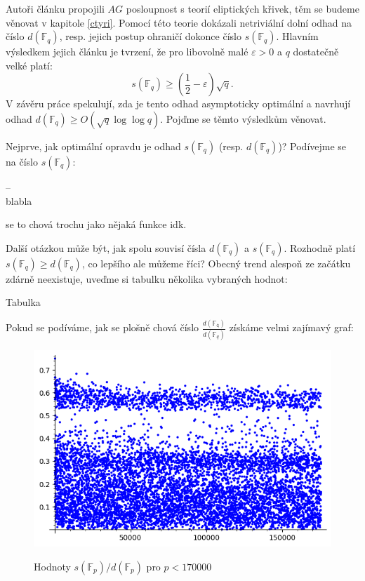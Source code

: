 \documentclass[12pt]{report}
\begin{document}
Autoři článku \cite{Meduza} propojili $AG$ posloupnost s teorií eliptických křivek, těm se budeme věnovat v kapitole \ref{ctyri}. Pomocí této teorie dokázali netriviální dolní odhad na číslo $d(\mathbb{F}_q)$, resp. jejich postup ohraničí dokonce číslo $s(\mathbb{F}_q)$. Hlavním výsledkem jejich článku je tvrzení, že pro libovolně malé $\varepsilon > 0$ a $q$ dostatečně velké platí:
$$s(\mathbb{F}_q) \geqslant \left( \frac{1}{2} - \varepsilon \right) \sqrt{q}.$$
V závěru práce spekulují, zda je tento odhad asymptoticky optimální a navrhují odhad $d(\mathbb{F}_q) \geqslant O(\sqrt{q} \log \log q)$. Pojďme se těmto výsledkům věnovat.

Nejprve, jak optimální opravdu je odhad $s(\mathbb{F}_q)$ (resp. $d(\mathbb{F}_q)$)?  Podívejme se na číslo $s(\mathbb{F}_q)$:

--\\



blabla

se to chová trochu jako nějaká funkce idk.

Další otázkou může být, jak spolu souvisí čísla $d(\mathbb{F}_q)$ a $s(\mathbb{F}_q)$. Rozhodně platí $s(\mathbb{F}_q) \geqslant d(\mathbb{F}_q)$, co lepšího ale můžeme říci? Obecný trend alespoň ze začátku zdárně neexistuje, uveďme si tabulku několika vybraných hodnot:

Tabulka

Pokud se podíváme, jak se plošně chová číslo $\frac{d(\mathbb{F_q})}{d(\mathbb{F}_q)}$ získáme velmi zajímavý graf:


\begin{figure}[h]
  \includegraphics[width=15cm]{Podil.png}
  \label{fig:boat1}
  \caption{Hodnoty $s(\mathbb{F}_p)/d(\mathbb{F}_p)$ pro $p < 170000$}
\end{figure}
\end{document}
